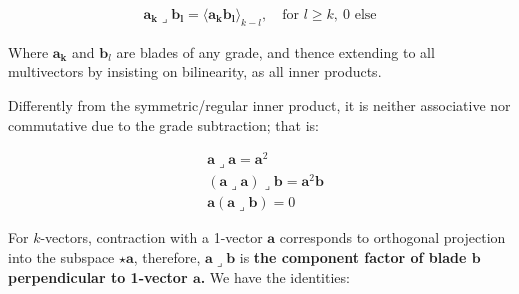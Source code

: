 \documentclass[a4paper]{book}
\numberwithin{equation}{chapter}
\begin{document}
\begin{align}
\mathbf{a_k\lrcorner b_l} = \langle \mathbf{a_kb_l} \rangle_{k-l}, \quad
\text{for } l\ge k, \ 0 \text{ else}
\end{align}

Where $\mathbf{a_k}$ and $\mathbf{b}_l$ are blades of any grade, and thence
extending to all multivectors by insisting on bilinearity, as all inner
products.

\vspace{\baselineskip}

Differently from the symmetric/regular inner product, it is neither
associative nor commutative due to the grade subtraction; that is:

\begin{align*}
    &\mathbf{a}\lrcorner\mathbf{a} = \mathbf{a}^2 \\
    &(\mathbf{a}\lrcorner\mathbf{a})\lrcorner\mathbf{b}=\mathbf{a}^2\mathbf{b} \\
    &\mathbf{a}(\mathbf{a\lrcorner b}) = 0
\end{align*}

For $k$-vectors, contraction with a 1-vector $\mathbf{a}$ corresponds to
orthogonal projection into the subspace $\star \mathbf{a}$, therefore,
$\mathbf{a\lrcorner b}$ is \textbf{the component factor of blade $\mathbf{b}$
perpendicular to 1-vector $\mathbf{a}$.} We have the identities:
\end{document}
